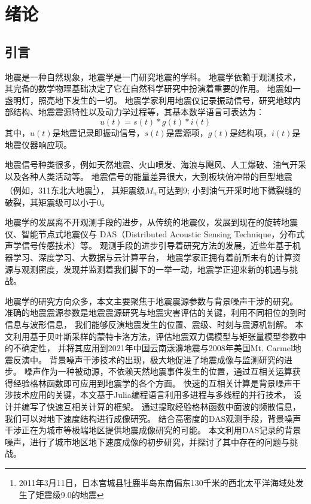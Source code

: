 
 

\chapter{绪论}

\section{引言}

地震是一种自然现象，地震学是一门研究地震的学科。
地震学依赖于观测技术，其完备的数学物理基础决定了它在自然科学研究中扮演着重要的作用。
地震如一盏明灯，照亮地下发生的一切\citep{陈颙2017}。
地震学家利用地震仪记录振动信号，研究地球内部结构、地震震源特性以及动力学过程等，其基本数学语言可表达为：
\begin{equation}
  u(t)=s(t)*g(t)*i(t)
\end{equation}
其中，$u(t)$是地震记录即振动信号，$s(t)$是震源项，$g(t)$是结构项，$i(t)$是地震仪器响应项。

地震信号种类很多，例如天然地震、火山喷发、海浪与飓风、人工爆破、油气开采以及各种人类活动等。
地震信号的能量差异很大，大到板块俯冲带的巨型地震（例如，311东北大地震\footnote{2011年3月11日，日本宫城县牡鹿半岛东南偏东130千米的西北太平洋海域处发生了矩震级9.0的地震}），
其矩震级$M_w$可达到9;
小到油气开采时地下微裂缝的破裂，其矩震级可以小于0。

地震学的发展离不开观测手段的进步，从传统的地震仪，发展到现在的旋转地震仪、智能节点式地震仪与
DAS（Distributed Acoustic Sensing Technique，分布式声学信号传感技术）等。
观测手段的进步引导着研究方法的发展，近些年基于机器学习、深度学习、大数据与云计算平台，
地震学家正拥有着前所未有的计算资源与观测密度，发现并监测着我们脚下的一举一动，地震学正迎来新的机遇与挑战。

地震学的研究方向众多，本文主要聚焦于地震震源参数与背景噪声干涉的研究。
准确的地震震源参数是地震震源研究与地震灾害评估的关键，利用不同相位的到时信息与波形信息，
我们能够反演地震发生的位置、震级、时刻与震源机制解。
本文利用基于贝叶斯采样的蒙特卡洛方法，评估地震双力偶模型与矩张量模型参数中的不确定性，
并将其应用到2021年中国云南漾濞地震与2008年美国Mt. Carmel地震反演中。
背景噪声干涉技术的出现，极大地促进了地震成像与监测研究的进步。
噪声作为一种被动源，不依赖天然地震事件发生的位置，通过互相关运算获得经验格林函数即可应用到地震学的各个方面。
快速的互相关计算是背景噪声干涉技术应用的关键，本文基于Julia编程语言利用多进程与多线程的并行技术，
设计并编写了快速互相关计算的框架。
通过提取经验格林函数中面波的频散信息，我们可以对地下速度结构进行成像研究。
结合高密度的DAS观测手段，背景噪声干涉正在为城市等极端地区提供地震成像研究的可能。
本文利用DAS记录的背景噪声，进行了城市地区地下速度成像的初步研究，并探讨了其中存在的问题与挑战。

